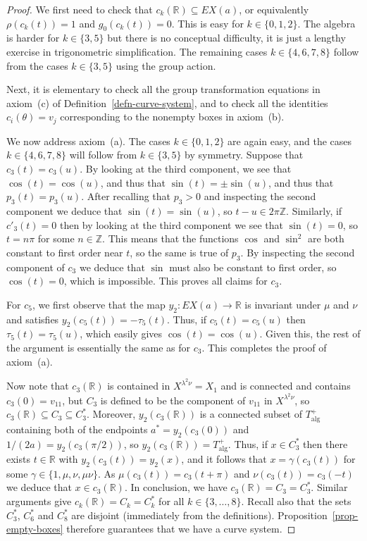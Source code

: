 \documentclass[reqno]{amsart}
\newcommand{\alg}	{\operatorname{alg}}
\newcommand{\gm}        {\gamma}
\newcommand{\tht}       {\theta}
\newcommand{\lm}        {\lambda}
\newcommand{\Z}         {{\mathbb{Z}}}
\newcommand{\R}         {{\mathbb{R}}}
\newcommand{\sse}       {\subseteq}
\renewcommand{\:}{\colon}
\theoremstyle{definition}
\begin{document}
\begin{proof}
 We first need to check that $c_k(\R)\sse EX(a)$, or equivalently
 $\rho(c_k(t))=1$ and $g_0(c_k(t))=0$.  This is easy for
 $k\in\{0,1,2\}$.  The algebra is harder for $k\in\{3,5\}$ but there
 is no conceptual difficulty, it is just a lengthy exercise in
 trigonometric simplification.  The remaining cases $k\in\{4,6,7,8\}$
 follow from the cases $k\in\{3,5\}$ using the group action.

 Next, it is elementary to check all the group transformation
 equations in axiom~(c) of Definition~\ref{defn-curve-system}, and to
 check all the identities $c_i(\tht)=v_j$ corresponding to the
 nonempty boxes in axiom~(b).

 We now address axiom~(a).  The cases $k\in\{0,1,2\}$ are again easy,
 and the cases $k\in\{4,6,7,8\}$ will follow from $k\in\{3,5\}$ by
 symmetry.  Suppose that $c_3(t)=c_3(u)$.  By looking at the third
 component, we see that $\cos(t)=\cos(u)$, and thus that
 $\sin(t)=\pm\sin(u)$, and thus that $p_3(t)=p_3(u)$.  After recalling
 that $p_3>0$ and inspecting the second component we deduce that
 $\sin(t)=\sin(u)$, so $t-u\in 2\pi\Z$.  Similarly, if $c'_3(t)=0$
 then by looking at the third component we see that $\sin(t)=0$, so
 $t=n\pi$ for some $n\in\Z$.  This means that the functions $\cos$ and
 $\sin^2$ are both constant to first order near $t$, so the same is
 true of $p_3$.  By inspecting the second component of $c_3$ we deduce
 that $\sin$ must also be constant to first order, so $\cos(t)=0$,
 which is impossible.  This proves all claims for $c_3$.

 For $c_5$, we first observe that the map $y_2\:EX(a)\to\R$ is
 invariant under $\mu$ and $\nu$ and satisfies
 $y_2(c_5(t))=-\tau_5(t)$.  Thus, if $c_5(t)=c_5(u)$ then
 $\tau_5(t)=\tau_5(u)$, which easily gives $\cos(t)=\cos(u)$.  Given
 this, the rest of the argument is essentially the same as for $c_3$.
 This completes the proof of axiom~(a).

 Now note that $c_3(\R)$ is contained in $X^{\lm^2\nu}=X_1$ and is
 connected and contains $c_3(0)=v_{11}$, but $C_3$ is defined to be
 the component of $v_{11}$ in $X^{\lm^2\nu}$, so
 $c_3(\R)\sse C_3\sse C_3^*$.  Moreover, $y_2(c_3(\R))$ is a connected
 subset of $T_{\alg}^+$ containing both of the endpoints
 $a^*=y_2(c_3(0))$ and $1/(2a)=y_2(c_3(\pi/2))$, so
 $y_2(c_3(\R))=T_{\alg}^+$.  Thus, if $x\in C_3^*$ then there exists
 $t\in\R$ with $y_2(c_3(t))=y_2(x)$, and it follows that
 $x=\gm(c_3(t))$ for some $\gm\in\{1,\mu,\nu,\mu\nu\}$.  As
 $\mu(c_3(t))=c_3(t+\pi)$ and $\nu(c_3(t))=c_3(-t)$ we deduce that
 $x\in c_3(\R)$.  In conclusion, we have $c_3(\R)=C_3=C_3^*$.  Similar
 arguments give $c_k(\R)=C_k=C_k^*$ for all $k\in\{3,\dotsc,8\}$.
 Recall also that the sets $C_3^*$, $C_6^*$ and $C_8^*$ are disjoint
 (immediately from the definitions).
 Proposition~\ref{prop-empty-boxes} therefore guarantees that we have
 a curve system.
\end{proof}
\end{document}
